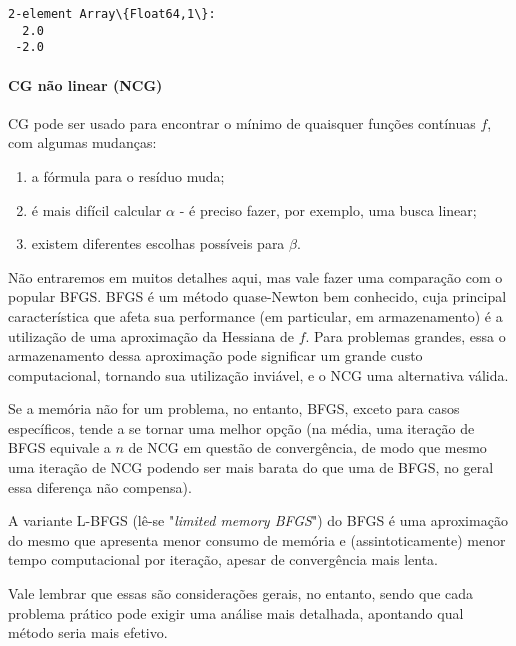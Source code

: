 \documentclass[11pt]{article}
\makeatletter
\providecommand{\tightlist}{%
      \setlength{\itemsep}{0pt}\setlength{\parskip}{0pt}}
\newcommand{\boxspacing}{\kern\kvtcb@left@rule\kern\kvtcb@boxsep}
\newcommand{\prompt}[4]{
        \ttfamily\llap{{\color{#2}[#3]:\hspace{3pt}#4}}\vspace{-\baselineskip}
    }
\makeatother
\begin{document}
            \begin{tcolorbox}[breakable, size=fbox, boxrule=.5pt, pad at break*=1mm, opacityfill=0]
\prompt{Out}{outcolor}{3}{\boxspacing}
\begin{Verbatim}[commandchars=\\\{\}]
2-element Array\{Float64,1\}:
  2.0
 -2.0
\end{Verbatim}
\end{tcolorbox}
        
    \paragraph{CG não linear (NCG)}\label{cg-nuxe3o-linear-ncg}

CG pode ser usado para encontrar o mínimo de quaisquer funções contínuas
\(f\), com algumas mudanças:

\begin{enumerate}
\def\labelenumi{\arabic{enumi}.}
\tightlist
\item
  a fórmula para o resíduo muda;
\item
  é mais difícil calcular \(\alpha\) - é preciso fazer, por exemplo, uma
  busca linear;
\item
  existem diferentes escolhas possíveis para \(\beta\).
\end{enumerate}

Não entraremos em muitos detalhes aqui, mas vale fazer uma comparação
com o popular BFGS. BFGS é um método quase-Newton bem conhecido, cuja
principal característica que afeta sua performance (em particular, em
armazenamento) é a utilização de uma aproximação da Hessiana de \(f\).
Para problemas grandes, essa o armazenamento dessa aproximação pode
significar um grande custo computacional, tornando sua utilização
inviável, e o NCG uma alternativa válida.

Se a memória não for um problema, no entanto, BFGS, exceto para casos
específicos, tende a se tornar uma melhor opção (na média, uma iteração
de BFGS equivale a \(n\) de NCG em questão de convergência, de modo que
mesmo uma iteração de NCG podendo ser mais barata do que uma de BFGS, no
geral essa diferença não compensa).

A variante L-BFGS (lê-se "\emph{limited memory BFGS}") do BFGS é uma
aproximação do mesmo que apresenta menor consumo de memória e
(assintoticamente) menor tempo computacional por iteração, apesar de
convergência mais lenta.

Vale lembrar que essas são considerações gerais, no entanto, sendo que
cada problema prático pode exigir uma análise mais detalhada, apontando
qual método seria mais efetivo.
\end{document}

